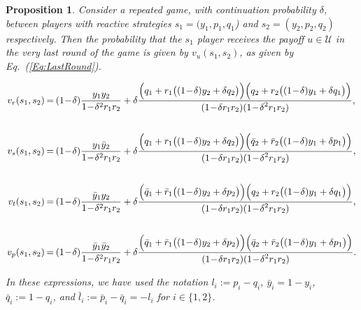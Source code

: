\documentclass[11pt]{article}
\theoremstyle{plainCl1}
\newtheorem{Prop}{Proposition}
\theoremstyle{plainCl2}
\begin{document}
\begin{Prop}\label{proposition:last_round} Consider a repeated game, with
    continuation probability $\delta$, between players with reactive strategies
    $s_1\!=\!(y_1, p_1, q_1$)  and $s_2\!=\!(y_2,p_2,q_2)$ respectively. Then
    the probability that the $s_1$ player receives the payoff $u\!\in\!
    \mathcal{U}$ in the very last round of the game is given by
    $v_{u}(s_1,s_2)$, as given by Eq.~(\ref{Eq:LastRound}).

    \begin{equation} \label{Eq:LastRound}
      \setlength{\arraycolsep}{1pt}
      \begin{array}{rcl}
    
      v_{r}(s_1,s_2) &= &\displaystyle (1\!-\!\delta)\frac{y_1y_2}{1\!-\!\delta^2 r_1 r_2}+\delta \frac{\Big(q_1+r_1\big((1\!-\!\delta)y_2+\delta q_2\big)\Big) \Big(q_2+r_2\big((1\!-\!\delta)y_1+\delta q_1\big)\Big)}
      {\displaystyle(1\!-\!\delta r_1r_2)(1\!-\!\delta^2 r_1 r_2)},\\[1cm]
    
      v_{s}(s_1,s_2) &= &\displaystyle (1\!-\!\delta)\frac{y_1\bar{y}_2}{1\!-\!\delta^2 r_1 r_2}+\delta \frac{\Big(q_1+r_1\big((1\!-\!\delta)y_2+\delta q_2\big)\Big) \Big(\bar{q}_2+\bar{r}_2\big((1\!-\!\delta)y_1+\delta p_1\big)\Big)}
      {\displaystyle(1\!-\!\delta r_1r_2)(1\!-\!\delta^2 r_1 r_2)},\\[1cm]
    
      v_{t}(s_1,s_2) &= &\displaystyle (1\!-\!\delta)\frac{\bar{y}_1y_2}{1\!-\!\delta^2 r_1 r_2}+\delta \frac{\Big(\bar{q}_1+\bar{r}_1\big((1\!-\!\delta)y_2+\delta p_2\big)\Big) \Big(q_2+r_2\big((1\!-\!\delta)y_1+\delta q_1\big)\Big)}
      {\displaystyle(1\!-\!\delta r_1r_2)(1\!-\!\delta^2 r_1 r_2)},\\[1cm]
    
      v_{p}(s_1,s_2) &= &\displaystyle (1\!-\!\delta)\frac{\bar{y}_1\bar{y}_2}{1\!-\!\delta^2 r_1 r_2}+\delta \frac{\Big(\bar{q}_1+\bar{r}_1\big((1\!-\!\delta)y_2+\delta p_2\big)\Big) \Big(\bar{q}_2+\bar{r}_2\big((1\!-\!\delta)y_1+\delta p_1\big)\Big)}
      {\displaystyle(1\!-\!\delta r_1r_2)(1\!-\!\delta^2 r_1 r_2)}.
      \end{array}
    \end{equation}

In these expressions, we have used the notation $l_i:=p_i\!-\!q_i$,
$\bar{y}_i\!=\!1\!-\!y_i$, $\bar{q}_i:=1\!-\!q_i$, and
$\bar{l}_i:=\bar{p}_i\!-\!\bar{q}_i=-l_i$ for $i\!\in\!\{1,2\}$.
\end{Prop}
\end{document}
